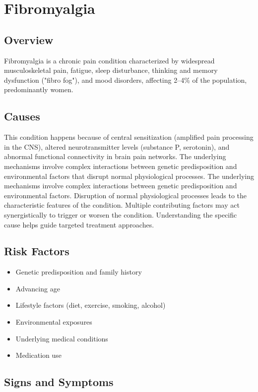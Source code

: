 \chapter{Fibromyalgia}
\label{sec:Fibromyalgia}

\section{Overview}
Fibromyalgia is a chronic pain condition characterized by widespread musculoskeletal pain, fatigue, sleep disturbance, thinking and memory dysfunction ("fibro fog"), and mood disorders, affecting 2--4\% of the population, predominantly women.
\section{Causes}
This condition happens because of central sensitization (amplified pain processing in the CNS), altered neurotransmitter levels (substance P, serotonin), and abnormal functional connectivity in brain pain networks. The underlying mechanisms involve complex interactions between genetic predisposition and environmental factors that disrupt normal physiological processes. The underlying mechanisms involve complex interactions between genetic predisposition and environmental factors. Disruption of normal physiological processes leads to the characteristic features of the condition. Multiple contributing factors may act synergistically to trigger or worsen the condition. Understanding the specific cause helps guide targeted treatment approaches.
\section{Risk Factors}


\begin{itemize}[noitemsep]
  \item Genetic predisposition and family history
  \item Advancing age
  \item Lifestyle factors (diet, exercise, smoking, alcohol)
  \item Environmental exposures
  \item Underlying medical conditions
  \item Medication use
\end{itemize}
\section{Signs and Symptoms}

